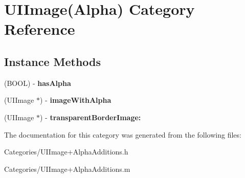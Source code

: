 \hypertarget{category_u_i_image_07_alpha_08}{}\section{U\+I\+Image(Alpha) Category Reference}
\label{category_u_i_image_07_alpha_08}
\subsection*{Instance Methods}
\begin{DoxyCompactItemize}
\item 
\hypertarget{category_u_i_image_07_alpha_08_aaa7da6121e2be6d47ec310859b4e4073}{}(B\+O\+O\+L) -\/ {\bfseries has\+Alpha}\label{category_u_i_image_07_alpha_08_aaa7da6121e2be6d47ec310859b4e4073}

\item 
\hypertarget{category_u_i_image_07_alpha_08_a86b4b95eccf2a445402eae94cc052ca8}{}(U\+I\+Image $\ast$) -\/ {\bfseries image\+With\+Alpha}\label{category_u_i_image_07_alpha_08_a86b4b95eccf2a445402eae94cc052ca8}

\item 
\hypertarget{category_u_i_image_07_alpha_08_ab36e32a47f4d333abb00d637b1e6dcd7}{}(U\+I\+Image $\ast$) -\/ {\bfseries transparent\+Border\+Image\+:}\label{category_u_i_image_07_alpha_08_ab36e32a47f4d333abb00d637b1e6dcd7}

\end{DoxyCompactItemize}


The documentation for this category was generated from the following files\+:\begin{DoxyCompactItemize}
\item 
Categories/U\+I\+Image+\+Alpha\+Additions.\+h\item 
Categories/U\+I\+Image+\+Alpha\+Additions.\+m\end{DoxyCompactItemize}
